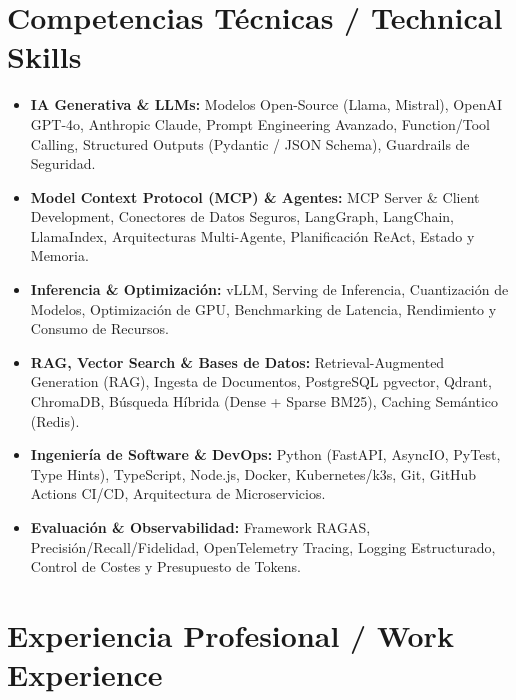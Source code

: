 \documentclass[a4paper,10pt]{article}
\begin{document}
\section{Competencias Técnicas / Technical Skills}
\begin{itemize}[leftmargin=1.2em, itemsep=2pt]
  \item \textbf{IA Generativa \& LLMs:} Modelos Open-Source (Llama, Mistral), OpenAI GPT-4o, Anthropic Claude, Prompt Engineering Avanzado, Function/Tool Calling, Structured Outputs (Pydantic / JSON Schema), Guardrails de Seguridad.
  \item \textbf{Model Context Protocol (MCP) \& Agentes:} MCP Server \& Client Development, Conectores de Datos Seguros, LangGraph, LangChain, LlamaIndex, Arquitecturas Multi-Agente, Planificación ReAct, Estado y Memoria.
  \item \textbf{Inferencia \& Optimización:} vLLM, Serving de Inferencia, Cuantización de Modelos, Optimización de GPU, Benchmarking de Latencia, Rendimiento y Consumo de Recursos.
  \item \textbf{RAG, Vector Search \& Bases de Datos:} Retrieval-Augmented Generation (RAG), Ingesta de Documentos, PostgreSQL pgvector, Qdrant, ChromaDB, Búsqueda Híbrida (Dense + Sparse BM25), Caching Semántico (Redis).
  \item \textbf{Ingeniería de Software \& DevOps:} Python (FastAPI, AsyncIO, PyTest, Type Hints), TypeScript, Node.js, Docker, Kubernetes/k3s, Git, GitHub Actions CI/CD, Arquitectura de Microservicios.
  \item \textbf{Evaluación \& Observabilidad:} Framework RAGAS, Precisión/Recall/Fidelidad, OpenTelemetry Tracing, Logging Estructurado, Control de Costes y Presupuesto de Tokens.
\end{itemize}

\section{Experiencia Profesional / Work Experience}
\end{document}
